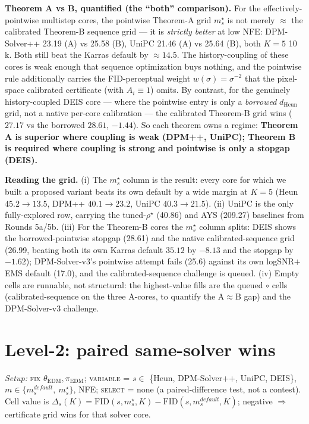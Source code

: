 \documentclass[11pt]{article}
\begin{document}
\noindent\textbf{Theorem A vs B, quantified (the ``both'' comparison).}
For the effectively-pointwise multistep cores, the pointwise Theorem-A
grid \(m_s^\star\) is not merely \(\approx\) the calibrated Theorem-B
sequence grid --- it is \emph{strictly better} at low NFE: DPM-Solver++
23.19 (A) vs 25.58 (B), UniPC 21.46 (A) vs 25.64 (B), both \(K{=}5\)
10\,k. Both still beat the Karras default by \(\approx 14.5\). The
history-coupling of these cores is weak enough that sequence
optimization buys nothing, and the pointwise rule additionally carries
the FID-perceptual weight \(w(\sigma){=}\sigma^{-2}\) that the
pixel-space calibrated certificate (with \(A_i{\equiv}1\)) omits. By
contrast, for the genuinely history-coupled DEIS core --- where the
pointwise entry is only a \emph{borrowed} \(d_{\mathrm{Heun}}\) grid, not
a native per-core calibration --- the calibrated Theorem-B grid wins
(\(27.17\) vs the borrowed \(28.61\), \(-1.44\)). So each theorem owns a
regime: \textbf{Theorem A is superior where coupling is weak
(DPM++, UniPC); Theorem B is required where coupling is strong and
pointwise is only a stopgap (DEIS).}

\noindent\textbf{Reading the grid.} (i) The \(m_s^\star\) column is the
result: every core for which we built a proposed variant beats its own
default by a wide margin at \(K{=}5\) (Heun \(45.2{\to}13.5\), DPM++
\(40.1{\to}23.2\), UniPC \(40.3{\to}21.5\)). (ii) UniPC is the only
fully-explored row, carrying the tuned-\(\rho^\star\) (40.86) and AYS
(209.27) baselines from Rounds 5a/5b. (iii) For the Theorem-B cores the
\(m_s^\star\) column splits: DEIS shows the borrowed-pointwise stopgap
(28.61) and the native calibrated-sequence grid (26.99, beating both its
own Karras default \(35.12\) by \(-8.13\) and the stopgap by \(-1.62\));
DPM-Solver-v3's pointwise attempt fails (25.6) against its own
logSNR\(+\)EMS default (17.0), and the calibrated-sequence challenge is
queued. (iv) Empty cells are runnable, not structural: the highest-value
fills are the queued \(\circ\) cells (calibrated-sequence on the three
A-cores, to quantify the A\(\approx\)B gap) and the DPM-Solver-v3
challenge.

\section{Level-2: paired same-solver wins}

\noindent\textit{Setup:} \textsc{fix} \(\theta_{\mathrm{EDM}},
\pi_{\mathrm{EDM}}\); \textsc{variable} = \(s \in\) \{Heun, DPM-Solver++,
UniPC, DEIS\}, \(m \in \{m_s^{default},\ m_s^\star\}\), NFE; \textsc{select}
= none (a paired-difference test, not a contest). Cell value is
\(\Delta_s(K) = \mathrm{FID}(s, m_s^\star, K) - \mathrm{FID}(s, m_s^{default}, K)\);
negative \(\Rightarrow\) certificate grid wins for that solver core.
\end{document}
